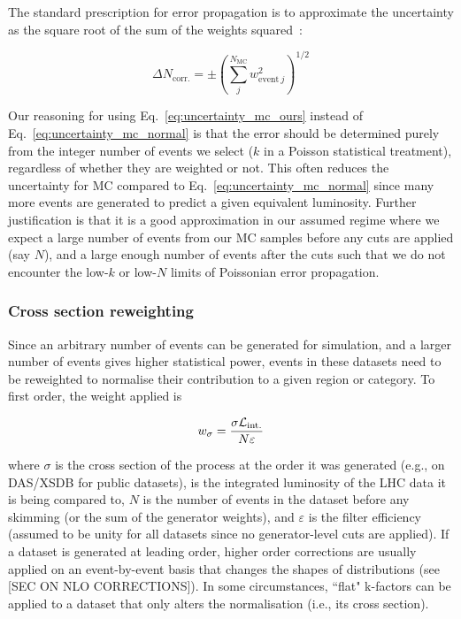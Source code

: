 The standard prescription for error propagation is to approximate the uncertainty as the square root of the sum of the weights squared~\cite{bevington2003data}:

\begin{equation}
\Delta N_{\mathrm{corr.}} = \pm \left( \sum_j^{N_{\mathrm{MC}}} w_{\mathrm{event} \ j}^2 \right) ^{1/2}
\label{eq:uncertainty_mc_normal}
\end{equation}

Our reasoning for using Eq.~\ref{eq:uncertainty_mc_ours} instead of Eq.~\ref{eq:uncertainty_mc_normal} is that the error should be determined purely from the integer number of events we select ($k$ in a Poisson statistical treatment), regardless of whether they are weighted or not. This often reduces the uncertainty for MC compared to Eq.~\ref{eq:uncertainty_mc_normal} since many more events are generated to predict a given equivalent luminosity. Further justification is that it is a good approximation in our assumed regime where we expect a large number of events from our MC samples before any cuts are applied (say $N$), and a large enough number of events after the cuts such that we do not encounter the low-$k$ or low-$N$ limits of Poissonian error propagation.




\subsubsection{Cross section reweighting}
\label{subsubsec:xs_weighting}

Since an arbitrary number of events can be generated for simulation, and a larger number of events gives higher statistical power, events in these datasets need to be reweighted to normalise their contribution to a given region or category. To first order, the weight applied is

\begin{equation}
w_{\sigma} = \frac{ \sigma \mathcal{L}_{\mathrm{int.}} }{ N \varepsilon }
\end{equation}

where $\sigma$ is the cross section of the process at the order it was generated (e.g., on DAS/XSDB for public datasets), \intlumi is the integrated luminosity of the LHC data it is being compared to, $N$ is the number of events in the dataset before any skimming (or the sum of the generator weights), and $\varepsilon$ is the filter efficiency (assumed to be unity for all datasets since no generator-level cuts are applied). If a dataset is generated at leading order, higher order corrections are usually applied on an event-by-event basis that changes the shapes of distributions (see [SEC ON NLO CORRECTIONS]). In some circumstances, ``flat" k-factors can be applied to a dataset that only alters the normalisation (i.e., its cross section).


